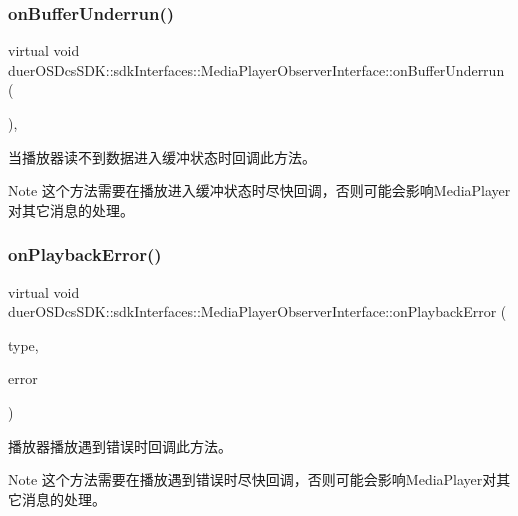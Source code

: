\subsubsection{\texorpdfstring{on\+Buffer\+Underrun()}{onBufferUnderrun()}}
{\footnotesize\ttfamily virtual void duer\+O\+S\+Dcs\+S\+D\+K\+::sdk\+Interfaces\+::\+Media\+Player\+Observer\+Interface\+::on\+Buffer\+Underrun (\begin{DoxyParamCaption}{ }\end{DoxyParamCaption})\hspace{0.3cm}{\ttfamily [inline]}, {\ttfamily [virtual]}}



当播放器读不到数据进入缓冲状态时回调此方法。 

\begin{DoxyNote}{Note}
这个方法需要在播放进入缓冲状态时尽快回调，否则可能会影响\+Media\+Player对其它消息的处理。 
\end{DoxyNote}
\mbox{\label{classduerOSDcsSDK_1_1sdkInterfaces_1_1MediaPlayerObserverInterface_a38aa45e3f2e3f125f6713e26c1bda5f4}} 
\subsubsection{\texorpdfstring{on\+Playback\+Error()}{onPlaybackError()}}
{\footnotesize\ttfamily virtual void duer\+O\+S\+Dcs\+S\+D\+K\+::sdk\+Interfaces\+::\+Media\+Player\+Observer\+Interface\+::on\+Playback\+Error (\begin{DoxyParamCaption}\item[{const Error\+Type \&}]{type,  }\item[{std\+::string}]{error }\end{DoxyParamCaption})\hspace{0.3cm}{\ttfamily [pure virtual]}}



播放器播放遇到错误时回调此方法。 

\begin{DoxyNote}{Note}
这个方法需要在播放遇到错误时尽快回调，否则可能会影响\+Media\+Player对其它消息的处理。
\end{DoxyNote}

